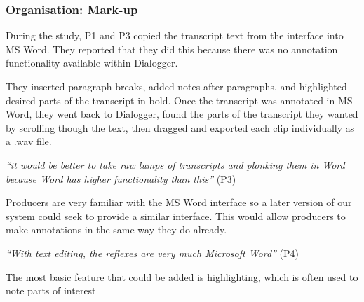 



\subsubsection{Organisation: Mark-up}



During the study, P1 and P3 copied the transcript text from the interface into MS Word. They
reported that they did this because there was no annotation functionality
available within Dialogger.

They inserted paragraph breaks, added notes after paragraphs, and
highlighted desired parts of the transcript in bold. Once the transcript was
annotated in MS Word, they went back to Dialogger, found the parts of the
transcript they wanted by scrolling though the text, then dragged and
exported each clip individually as a .wav file.

\textit{``it would be better to take raw lumps of transcripts and plonking them
  in Word because Word has higher functionality than this''} (P3)

Producers are very familiar with the MS Word interface so a later version of our
system could seek to provide a similar interface. This would allow producers to make annotations in the same way they
do already.

\textit{``With text editing, the reflexes are very much Microsoft Word''} (P4)

The most basic feature that could be added is highlighting, which is often used to note parts of interest

